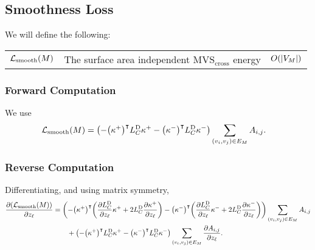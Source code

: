 

\subsection{Smoothness Loss}

We will define the following: \begin{center}\begin{tabular}{r|l|l}
	\(\mathcal{L}_{\mathrm{smooth}}\pof{M}\) & The surface area independent \(\text{MVS}_{\text{cross}}\) energy \cite{Joshi2007EnergyMF} & \(O\pof{\abs{V_M}}\)
\end{tabular}\end{center}

\subsubsection{Forward Computation}
We use \begin{align*}
	\mathcal{L}_{\mathrm{smooth}}\pof{M} &= \pof{-\pof{\kappa^+}^\intercal L_C^{\text{D}}\kappa^+ - \pof{\kappa^-}^\intercal L_C^{\text{D}}\kappa^-} \sum_{\pof{v_i, v_j} \in E_M} A_{i, j}.
\end{align*}

\subsubsection{Reverse Computation}
Differentiating, and using matrix symmetry, \begin{align*}
	\frac{\partial\pof{\mathcal{L}_{\mathrm{smooth}}\pof{M}}}{\partial z_\ell} &= \pof{-\pof{\kappa^+}^\intercal\pof{\frac{\partial L_C^{\text{D}}}{\partial z_\ell}\kappa^+ + 2L_C^{\text{D}}\frac{\partial\kappa^+}{\partial z_\ell}} - \pof{\kappa^-}^\intercal\pof{\frac{\partial L_C^{\text{D}}}{\partial z_\ell}\kappa^- + 2L_C^{\text{D}}\frac{\partial\kappa^-}{\partial z_\ell}}} \sum_{\pof{v_i, v_j} \in E_M} A_{i, j} \\
		&\qquad+ \pof{-\pof{\kappa^+}^\intercal L_C^{\text{D}}\kappa^+ - \pof{\kappa^-}^\intercal L_C^{\text{D}}\kappa^-} \sum_{\pof{v_i, v_j} \in E_M} \frac{\partial A_{i, j}}{\partial z_\ell}.
\end{align*}
